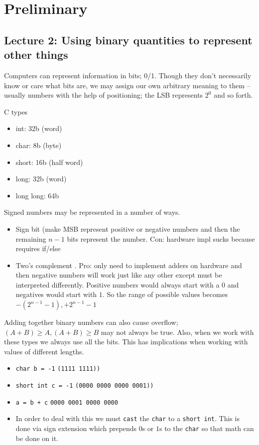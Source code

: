 \documentclass[../notes.tex]{subfiles}
\begin{document}
\section{Preliminary}
\subsection{Lecture 2: Using binary quantities to represent other things}

Computers can represent information in bits; 0/1. 
Though they don't necessarily know or care what bits are, we may assign our own arbitrary meaning to them -- usually numbers with the help of positioning; the LSB represents $ 2^0 $ and so forth.

C types 
	\begin{itemize}
		\item int: 32b (word)
		\item char: 8b (byte)
		\item short: 16b (half word)
		\item long: 32b (word)
		\item long long: 64b
	\end{itemize}

Signed numbers may be represented in a number of ways.
\begin{itemize}
	\item Sign bit (make MSB represent positive or negative numbers and then the remaining $ n-1 $ bits represent the number. Con: hardware impl sucks because requires if/else
	\item Two's complement . Pro: only need to implement adders on hardware and then negative numbers will work just like any other except must be interpreted differently. Positive numbers would always start with a $ 0 $ and negatives would start with $ 1 $. So the range of possible values becomes $ -(2^{n-1}-1), +2^{n-1}-1$ 
\end{itemize}

Adding together binary numbers can also cause overflow; $ (A+B) \ge A, (A+B) \ge  B $ may not always be true.
Also, when we work with these types we always use all the bits. This has implications when working with values of different lengths.

\begin{itemize}
	\item \texttt{char b = -1}  \texttt{(1111 1111))}
	\item \texttt{short int c = -1}  \texttt{(0000 0000 0000 0001))}
	\item \texttt{a = b + c} \texttt{0000 0001 0000 0000 } 
	\item In order to deal with this we must \texttt{cast} the \texttt{char} to a \texttt{short int}. This is done via sign extension which prepends $ 0 $s or $ 1 $s  to the \texttt{char} so that math can be done on it.
\end{itemize}
\end{document}
